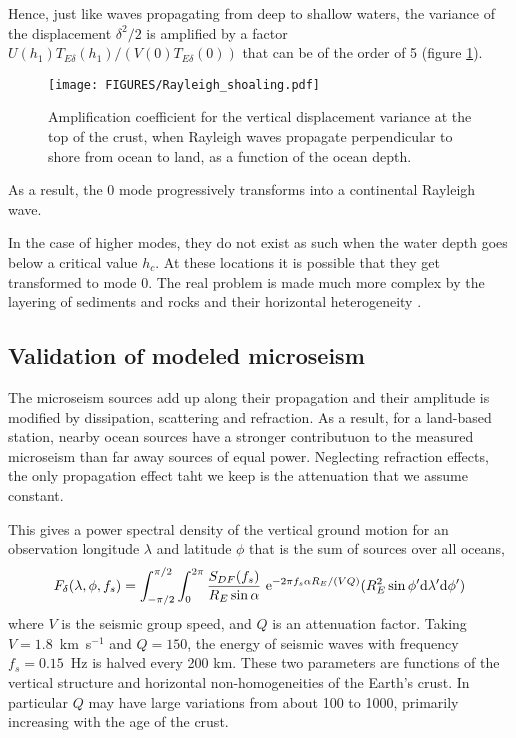 Hence, just like waves propagating from deep 
to  shallow waters,
the variance of the displacement $\delta^2/2$ is amplified by a factor 
$U(h_1) T_{E \delta}(h_1) /(V(0) T_{E \delta}(0))$ that can be of the order of 
5 (figure \ref{fig:Rayleigh_shoaling}).
\begin{figure}
\centerline{\texttt{[image: FIGURES/Rayleigh\_shoaling.pdf]}}
  \caption{Amplification coefficient for the vertical displacement variance at the top of the crust, when Rayleigh waves propagate perpendicular to shore from ocean to land, as a function of the ocean depth.}
\label{fig:Rayleigh_shoaling}
\end{figure}
As a result, the 0 mode progressively transforms into a continental Rayleigh wave. 

In the case of higher modes, they do not exist as such when the water depth goes below a critical value $h_c$. 
At these locations it is possible that they get transformed to mode 0.  
The real problem is made much more complex by the layering of sediments and rocks and their horizontal heterogeneity \citep{Gualtieri&al.2015}.

\subsection{Validation of modeled microseism}
The microseism sources add up along their propagation and their amplitude is modified by dissipation, scattering and refraction.  As a result, for a land-based station, nearby ocean sources have a stronger contributuon to the measured microseism than far away sources of equal power. Neglecting refraction effects, the only propagation effect taht we keep is the attenuation that we assume constant. 

This gives a power spectral density of the vertical ground motion for an observation longitude $\lambda$ and latitude $\phi$ that is the sum of sources over all oceans, 
\begin{equation}
F_\delta(\lambda,\phi,f_s)  =  \int_{- \pi/2}^{ \pi/2} \int_0^{2 \pi}\frac{S_{DF}(f_s)}{R_E \sin \alpha} ~ \mathrm{e}^{-2 \pi  f_s \alpha R_E / (V Q)}  (R_E^2 \sin \phi' {\mathrm d} \lambda' 
{\mathrm d} \phi')  \label{F_delta}\nonumber\\\end{equation}
where $V$ is the seismic group speed, and $Q$ is an attenuation factor. 
Taking  $V=1.8$~km~s$^{-1}$ and $Q=150$, the energy of seismic waves with frequency $f_s=0.15$~Hz is halved every 200 km. These two parameters are functions of the vertical structure and horizontal non-homogeneities of the Earth's crust. In particular $Q$ may have large variations from about 100 to 1000, primarily increasing with the age of the crust. 

